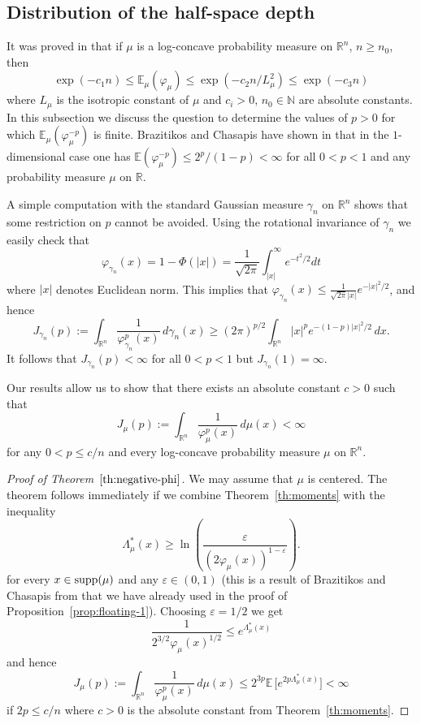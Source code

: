 \documentclass[11pt,leqno]{article}
\theoremstyle{definition}
\theoremstyle{remark}
\numberwithin{equation}{section}
\newcommand{\ls}{\leqslant}
\newcommand{\gr}{\geqslant}
\newcommand{\1}{\textbf{1}}
\begin{document}
\subsection{Distribution of the half-space depth}\label{subsection-4.2}

It was proved in \cite{BGP-depth} that if $\mu$ is a log-concave probability measure on ${\mathbb R}^n$, $n\gr n_0$, then
$$\exp(-c_1n)\ls {\mathbb E}_{\mu }(\varphi_{\mu }) \ls \exp\left(-c_2n/L_{\mu}^2\right)\ls\exp(-c_3n)$$
where $L_{\mu }$ is the isotropic constant of $\mu $ and $c_i>0$, $n_0\in {\mathbb N}$ are absolute constants.
In this subsection we discuss the question to determine the values of $p>0$ for which
${\mathbb E}_{\mu }(\varphi_{\mu }^{-p})$ is finite. Brazitikos and Chasapis have shown in \cite[Proposition~3.2]{Brazitikos-Chasapis-2024}
that in the $1$-dimensional case one has ${\mathbb E}(\varphi_{\mu}^{-p})\ls 2^p/(1-p)<\infty $
for all $0<p<1$ and any probability measure $\mu$ on $\mathbb{R}$.

A simple computation with the standard Gaussian measure $\gamma_n$ on $\mathbb{R}^n$ shows that some restriction
on $p$ cannot be avoided. Using the rotational invariance of $\gamma_n$ we easily check that
$$\varphi_{\gamma_n}(x)=1-\Phi(|x|)=\frac{1}{\sqrt{2\pi}}\int_{|x|}^{\infty}e^{-t^2/2}dt$$
where $|x|$ denotes Euclidean norm. This implies that $\varphi_{\gamma_n}(x)\ls \frac{1}{\sqrt{2\pi}|x|}e^{-|x|^2/2}$,
and hence
$$J_{\gamma_n}(p):=\int_{{\mathbb R}^n}\frac{1}{\varphi_{\gamma_n}^p(x)}\,d\gamma_n(x)\gr (2\pi)^{p/2}\int_{{\mathbb R}^n}|x|^pe^{-(1-p)|x|^2/2}\,dx.$$
It follows that $J_{\gamma_n}(p)<\infty$ for all $0<p<1$ but $J_{\gamma_n}(1)=\infty$.

Our results allow us to show that there exists an absolute constant $c>0$ such that
$$J_{\mu}(p):=\int_{{\mathbb R}^n}\frac{1}{\varphi_{\mu}^p(x)}\,d\mu (x)<\infty$$
for any $0<p\ls c/n$ and every log-concave probability measure $\mu$ on $\mathbb{R}^n$.

\begin{proof}[Proof of Theorem~$\ref{th:negative-phi}$]We may assume that $\mu$ is centered.
The theorem follows immediately if we combine Theorem~\ref{th:moments}
with the inequality
$$\Lambda_{\mu}^{\ast}(x)\gr \ln\left(\frac{\varepsilon}{(2\varphi_{\mu}(x))^{1-\varepsilon}}\right).$$
for every $x\in {\rm supp}(\mu)$ and any $\varepsilon\in (0,1)$ (this is a result of Brazitikos and Chasapis from \cite{Brazitikos-Chasapis-2024} that we have already used in the proof of Proposition~\ref{prop:floating-1}).
Choosing $\varepsilon=1/2$ we get
$$\frac{1}{2^{3/2}\varphi_{\mu}(x)^{1/2}}\ls e^{\Lambda_{\mu}^{\ast}(x)}$$
and hence
$$J_{\mu}(p):=\int_{{\mathbb R}^n}\frac{1}{\varphi_{\mu}^p(x)}\,d\mu (x)\ls
2^{3p}{\mathbb E}\,\big[e^{2p\Lambda_{\mu}^{\ast}(x)}\big]<\infty$$
if $2p\ls c/n$ where $c>0$ is the absolute constant from Theorem~\ref{th:moments}.
\end{proof}
\end{document}
